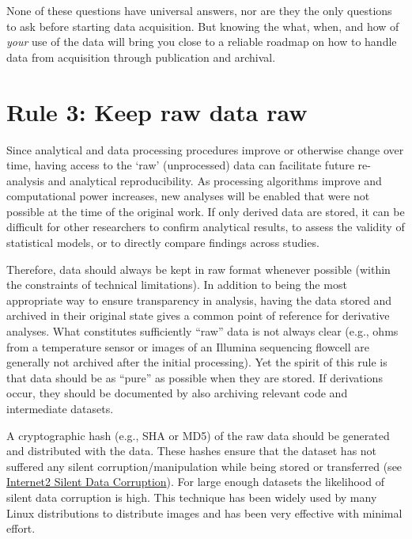 \documentclass[10pt,letterpaper]{article}
\begin{document}
None of these questions have universal answers, nor are they the only
questions to ask before starting data acquisition. But knowing the what,
when, and how of \emph{your} use of the data will bring you close to a
reliable roadmap on how to handle data from acquisition through
publication and archival.

\section*{Rule 3: Keep raw data raw}\label{rule-3-keep-raw-data-raw}

Since analytical and data processing procedures improve or otherwise
change over time, having access to the `raw' (unprocessed) data can
facilitate future re-analysis and analytical reproducibility. As
processing algorithms improve and computational power increases, new
analyses will be enabled that were not possible at the time of the
original work. If only derived data are stored, it can be difficult for
other researchers to confirm analytical results, to assess the validity
of statistical models, or to directly compare findings across studies.

Therefore, data should always be kept in raw format whenever possible
(within the constraints of technical limitations). In addition to being
the most appropriate way to ensure transparency in analysis, having the
data stored and archived in their original state gives a common point of
reference for derivative analyses. What constitutes sufficiently ``raw''
data is not always clear (e.g., ohms from a temperature sensor or images
of an Illumina sequencing flowcell are generally not archived after the
initial processing). Yet the spirit of this rule is that data should be
as ``pure'' as possible when they are stored. If derivations occur, they
should be documented by also archiving relevant code and intermediate
datasets.

A cryptographic hash (e.g., SHA or MD5) of the raw data should be
generated and distributed with the data. These hashes ensure that the
dataset has not suffered any silent corruption/manipulation while being
stored or transferred (see
\href{https://www.xsede.org/news/-/news/item/6390}{Internet2 Silent Data
Corruption}). For large enough datasets the likelihood of silent data
corruption is high. This technique has been widely used by many Linux
distributions to distribute images and has been very effective with
minimal effort.
\end{document}
